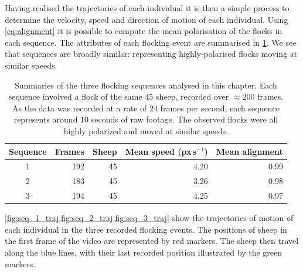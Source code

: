 Having realised the trajectories of each individual it is then a simple process
to determine the velocity, speed and direction of motion of each individual.
Using \cref{eq:alignment} it is possible to compute the mean polarisation of
the flocks in each sequence. The attributes of each flocking event are
summarised in \cref{tab:data_summary}. We see that sequences are broadly
similar: representing highly-polarised flocks moving at similar speeds.

\begin{table}[tbp]
\begin{tabular}{@{}crrrr@{}}
\toprule
Sequence & Frames & Sheep & Mean speed (px\,s$^{-1}$) & Mean alignment \\
\midrule
1 &    192 &     45 &      4.20 &          0.99 \\
2 &    183 &     45 &      3.26 &          0.98 \\
3 &    194 &     45 &      4.25 &          0.97 \\
\bottomrule
\end{tabular}
\caption{Summaries of the three flocking sequences analysed in this chapter.
    Each sequence involved a flock of the same $45$ sheep, recorded over
    $\approx200$ frames. As the data was recorded at a rate of $24$ frames per
    second, each sequence represents around $10$ seconds of raw footage. The
    observed flocks were all highly polarized and moved at similar speeds.}
\label{tab:data_summary}
\end{table}

\cref{fig:seq_1_traj,fig:seq_2_traj,fig:seq_3_traj} show the trajectories of
motion of each individual in the three recorded flocking events. The positions
of sheep in the first frame of the video are represented by red markers. The
sheep then travel along the blue lines, with their last recorded position
illustrated by the green markers.

